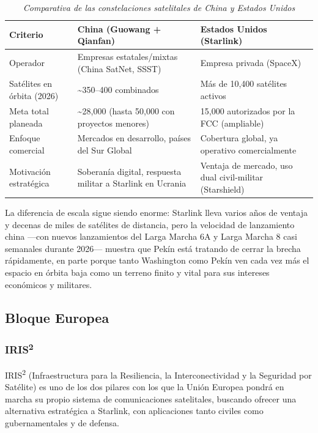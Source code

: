 \begin{table}[htbp]
\centering
\caption{\textit{Comparativa de las constelaciones satelitales de China y Estados Unidos}}


\label{tab:comparativa-satelites}
\renewcommand{\arraystretch}{1.4}
\begin{tabular}{|p{3cm}|p{5.5cm}|p{5.5cm}|}
\hline
\textbf{Criterio} & \textbf{China (Guowang + Qianfan)} & \textbf{Estados Unidos (Starlink)} \\
\hline
Operador & Empresas estatales/mixtas (China SatNet, SSST) & Empresa privada (SpaceX) \\
\hline
Satélites en órbita (2026) & \textasciitilde 350--400 combinados & Más de 10,400 satélites activos \\
\hline
Meta total planeada & \textasciitilde 28,000 (hasta 50,000 con proyectos menores) & 15,000 autorizados por la FCC (ampliable) \\
\hline
Enfoque comercial & Mercados en desarrollo, países del Sur Global & Cobertura global, ya operativo comercialmente \\
\hline
Motivación estratégica & Soberanía digital, respuesta militar a Starlink en Ucrania & Ventaja de mercado, uso dual civil-militar (Starshield) \\
\hline
\end{tabular}
\end{table}


La diferencia de escala sigue siendo enorme: Starlink lleva varios años de ventaja y decenas de miles de satélites de distancia, pero la velocidad de lanzamiento china —con nuevos lanzamientos del Larga Marcha 6A y Larga Marcha 8 casi semanales durante 2026— muestra que Pekín está tratando de cerrar la brecha rápidamente, en parte porque tanto Washington como Pekín ven cada vez más el espacio en órbita baja como un terreno finito y vital para sus intereses económicos y militares.


\subsection{Bloque Europea}
\subsubsection{IRIS\textsuperscript{2}}

IRIS\textsuperscript{2} (Infraestructura para la Resiliencia, la Interconectividad y la Seguridad por Satélite) es uno de los dos pilares con los que la Unión Europea pondrá en marcha su propio sistema de comunicaciones satelitales, buscando ofrecer una alternativa estratégica a Starlink, con aplicaciones tanto civiles como gubernamentales y de defensa.

